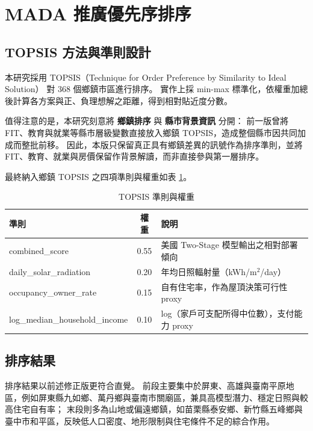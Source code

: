 \documentclass[12pt, a4paper]{article}
\begin{document}
\section{MADA 推廣優先序排序}

\subsection{TOPSIS 方法與準則設計}

本研究採用 TOPSIS（Technique for Order Preference by Similarity to Ideal Solution）\citep{hwang1981topsis} 對 368 個鄉鎮市區進行排序。
實作上採 min-max 標準化，依權重加總後計算各方案與正、負理想解之距離，得到相對貼近度分數。

值得注意的是，本研究刻意將 \textbf{鄉鎮排序} 與 \textbf{縣市背景資訊} 分開：
前一版曾將 FIT、教育與就業等縣市層級變數直接放入鄉鎮 TOPSIS，造成整個縣市因共同加成而整批前移。
因此，本版只保留真正具有鄉鎮差異的訊號作為排序準則，並將 FIT、教育、就業與房價保留作背景解讀，而非直接參與第一層排序。

最終納入鄉鎮 TOPSIS 之四項準則與權重如表 \ref{tab:topsis_criteria}。

\begin{table}[H]
\caption{TOPSIS 準則與權重}
\label{tab:topsis_criteria}
\centering
\small
\begin{tabular}{lcp{5.5cm}}
\toprule
準則 & 權重 & 說明 \\
\midrule
combined\_score & 0.55 & 美國 Two-Stage 模型輸出之相對部署傾向 \\
daily\_solar\_radiation & 0.20 & 年均日照輻射量（kWh/m$^2$/day） \\
occupancy\_owner\_rate & 0.15 & 自有住宅率，作為屋頂決策可行性 proxy \\
log\_median\_household\_income & 0.10 & log（家戶可支配所得中位數），支付能力 proxy \\
\bottomrule
\end{tabular}
\end{table}

\subsection{排序結果}

排序結果以前述修正版更符合直覺。
前段主要集中於屏東、高雄與臺南平原地區，例如屏東縣九如鄉、萬丹鄉與臺南市關廟區，兼具高模型潛力、穩定日照與較高住宅自有率；
末段則多為山地或偏遠鄉鎮，如苗栗縣泰安鄉、新竹縣五峰鄉與臺中市和平區，反映低人口密度、地形限制與住宅條件不足的綜合作用。
\end{document}
